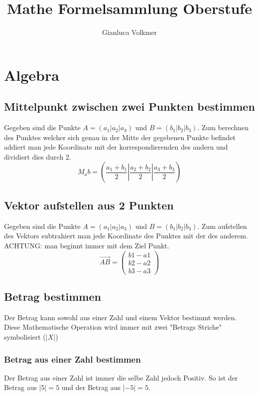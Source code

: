 \documentclass{article}
\title{Mathe Formelsammlung Oberstufe}
\author{Gianluca Volkmer}
\begin{document}
\maketitle
\pagebreak

\tableofcontents
\pagebreak

\section{Algebra}

\subsection{Mittelpunkt zwischen zwei Punkten bestimmen}
Gegeben sind die Punkte $A = (a_1 | a_2 | a_3)$ und $B = (b_1 | b_2 | b_3)$. Zum berechnen des Punktes welcher sich genau in der Mitte der gegebenen Punkte befindet addiert man jede Koordinate mit der korrespondierenden des andern und dividiert dies durch 2.
\begin{equation}
M_ab = (\frac{a_1+b_1}{2} | \frac{a_2+b_2}{2} | \frac{a_3+b_3}{2})
\end{equation}

\subsection{Vektor aufstellen aus 2 Punkten} \label{VektorAufstellen}
Gegeben sind die Punkte $A = (a_1 | a_2 | a_3)$ und $B = (b_1 | b_2 | b_3)$. Zum aufstellen des Vektors subtrahiert man jede Koordinate des Punktes mit der des anderem. ACHTUNG: man beginnt immer mit dem Ziel Punkt.
\begin{equation}
\vec{AB} = \begin{pmatrix} b1-a1 \\ b2-a2 \\ b3-a3 \end{pmatrix}
\end{equation}

\subsection{Betrag bestimmen}
Der Betrag kann sowohl aus einer Zahl und einem Vektor bestimmt werden. Diese Mathematische Operation wird immer mit zwei "Betrags Striche" symbolisiert ($|X|$) 

\subsubsection{Betrag aus einer Zahl bestimmen}
Der Betrag aus einer Zahl ist immer die selbe Zahl jedoch Positiv. So ist der Betrag aus $|5| = 5$ und der Betrag aus $|-5| = 5$.
\end{document}
